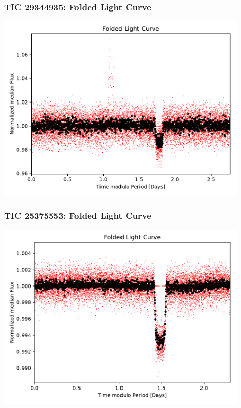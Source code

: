 \documentclass[notes]{beamer}
\begin{document}
\begin{frame}
\frametitle{TIC 29344935: Folded Light Curve}
\centering
\includegraphics[width=0.9\textwidth]{../figures/2019-1-16_12:58:51_Folded_TIC29344935.pdf}
\end{frame}

\begin{frame}
\frametitle{TIC 25375553: Folded Light Curve}
\centering
\includegraphics[width=0.9\textwidth]{../figures/2019-1-16_12:58:51_Folded_TIC25375553.pdf}
\end{frame}
\end{document}
